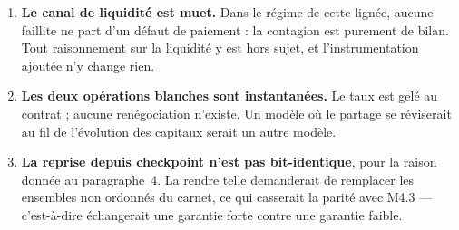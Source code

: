 \documentclass[11pt,a4paper]{article}
\begin{document}
\begin{enumerate}
\item \textbf{Le canal de liquidité est muet.} Dans le régime de cette
      lignée, aucune faillite ne part d'un défaut de paiement : la contagion
      est purement de bilan. Tout raisonnement sur la liquidité y est hors
      sujet, et l'instrumentation ajoutée n'y change rien.
\item \textbf{Les deux opérations blanches sont instantanées.} Le taux est
      gelé au contrat ; aucune renégociation n'existe. Un modèle où le
      partage se réviserait au fil de l'évolution des capitaux serait un
      autre modèle.
\item \textbf{La reprise depuis checkpoint n'est pas bit-identique}, pour la
      raison donnée au paragraphe~4. La rendre telle demanderait de remplacer
      les ensembles non ordonnés du carnet, ce qui casserait la parité avec
      M4.3 --- c'est-à-dire échangerait une garantie forte contre une
      garantie faible.
\end{enumerate}
\end{document}
